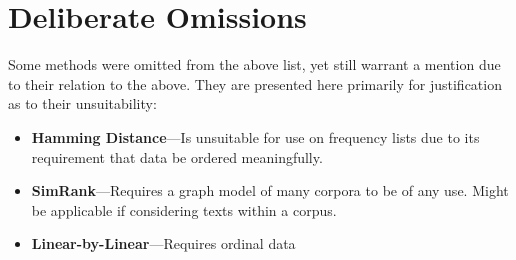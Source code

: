\documentclass[11pt]{article}
\begin{document}
\appendix

\section{Deliberate Omissions}
Some methods were omitted from the above list, yet still warrant a mention due to their relation to the above.  They are presented here primarily for justification as to their unsuitability:
\begin{itemize}
    \item \textbf{Hamming Distance}---Is unsuitable for use on frequency lists due to its requirement that data be ordered meaningfully.
    \item \textbf{SimRank}---Requires a graph model of many corpora to be of any use.  Might be applicable if considering texts within a corpus.
    \item \textbf{Linear-by-Linear}---Requires ordinal data
\end{itemize}
\end{document}
